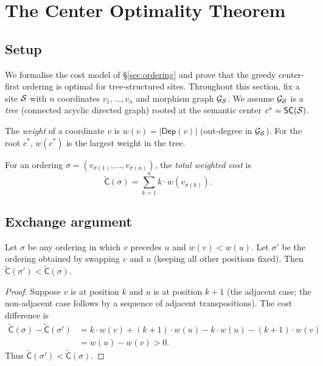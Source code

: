 \documentclass[11pt]{article}
\newcommand{\SC}{\mathsf{SC}}               %
\newcommand{\MG}{\mathcal{G}_{\Site}}       %
\newcommand{\VerCost}{\mathsf{C}}           %
\newcommand{\DepSet}{\mathsf{Dep}}          %
\newcommand{\wtotal}{\widetilde{\VerCost}}  %
\newcommand{\anyord}{\sigma}                %
\newcommand{\wt}{w}                         %
\begin{document}
\section{The Center Optimality Theorem}\label{sec:theorem}

\subsection{Setup}

We formalise the cost model of \S\ref{sec:ordering} and prove that the
greedy center-first ordering is optimal for tree-structured sites.
Throughout this section, fix a site $\mathcal{S}$ with $n$ coordinates
$v_1, \ldots, v_n$ and morphism graph $\MG$.  We assume $\MG$ is a
\emph{tree} (connected acyclic directed graph) rooted at the semantic
center $c^* = \SC(\Site)$.

\begin{definition}\label{def:weight}
The \emph{weight} of a coordinate $v$ is $\wt(v) = |\DepSet(v)|$
(out-degree in $\MG$).  For the root $c^*$, $\wt(c^*)$ is the largest
weight in the tree.
\end{definition}

\begin{definition}\label{def:ord-cost}
For an ordering $\anyord = (v_{\anyord(1)}, \ldots, v_{\anyord(n)})$,
the \emph{total weighted cost} is
\[
  \wtotal(\anyord)
  = \sum_{k=1}^{n} k \cdot \wt(v_{\anyord(k)}).
\]
\end{definition}

\subsection{Exchange argument}

\begin{lemma}\label{lem:exchange}
Let $\anyord$ be any ordering in which $v$ precedes $u$ and
$\wt(v) < \wt(u)$.  Let $\anyord'$ be the ordering obtained by
swapping $v$ and $u$ (keeping all other positions fixed).  Then
$\wtotal(\anyord') < \wtotal(\anyord)$.
\end{lemma}
\begin{proof}
Suppose $v$ is at position $k$ and $u$ is at position $k + 1$ (the
adjacent case; the non-adjacent case follows by a sequence of adjacent
transpositions).  The cost difference is
\begin{align*}
  \wtotal(\anyord) - \wtotal(\anyord')
  &= k \cdot \wt(v) + (k{+}1) \cdot \wt(u)
   - k \cdot \wt(u) - (k{+}1) \cdot \wt(v) \\
  &= \wt(u) - \wt(v) > 0.
\end{align*}
Thus $\wtotal(\anyord') < \wtotal(\anyord)$.
\end{proof}
\end{document}
